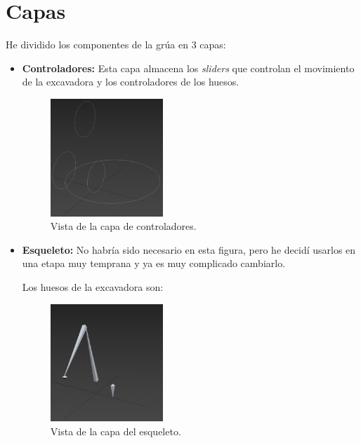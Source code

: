 \newpage

\section{Capas}

He dividido los componentes de la grúa en 3 capas:

\begin{itemize}
    \item \textbf{Controladores: }Esta capa almacena los \textit{sliders} que controlan el movimiento de la excavadora y los controladores de los huesos.
    
    \begin{figure}[H]
        \centering
        \includegraphics[width=0.4\textwidth]{imagenes/controladorcapa.png}
        \caption{Vista de la capa de controladores.}
     \end{figure}

    \item \textbf{Esqueleto: }No habría sido necesario en esta figura, pero he decidí usarlos en una etapa muy temprana y ya es muy complicado cambiarlo.
    
    Los huesos de la excavadora son:


    \begin{figure}[H]
        \centering
        \includegraphics[width=0.4\textwidth]{imagenes/esqueletocapa.png}
        \caption{Vista de la capa del esqueleto.}
     \end{figure}


\end{itemize}
